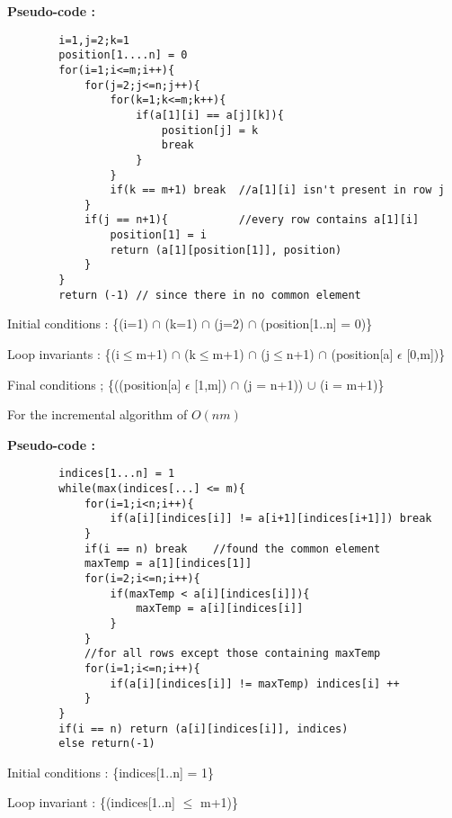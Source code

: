 \documentclass[12pt]{article}
\begin{document}
\begin{enumerate}
    \textbf{Pseudo-code :}
    \begin{verbatim}
        i=1,j=2;k=1
        position[1....n] = 0
        for(i=1;i<=m;i++){
            for(j=2;j<=n;j++){
                for(k=1;k<=m;k++){
                    if(a[1][i] == a[j][k]){
                        position[j] = k
                        break
                    }
                }
                if(k == m+1) break  //a[1][i] isn't present in row j
            }
            if(j == n+1){           //every row contains a[1][i]
                position[1] = i
                return (a[1][position[1]], position)
            }
        }
        return (-1) // since there in no common element
    \end{verbatim}
     Initial conditions : \{(i=1) $\cap$ (k=1) $\cap$ (j=2) $\cap$ (position[1..n] = 0)\}
    
    Loop invariants : \{(i$\leq$m+1) $\cap$ (k$\leq$m+1) $\cap$ (j$\leq$n+1) $\cap$ (position[a] $\epsilon$ [0,m])\}
    
    Final conditions ; \{((position[a] $\epsilon$ [1,m]) $\cap$ (j = n+1)) $\cup$ (i = m+1)\}    
    
    For the incremental algorithm of $O(nm)$
    
    \textbf{Pseudo-code :}
    \begin{verbatim}
        indices[1...n] = 1
        while(max(indices[...] <= m){
            for(i=1;i<n;i++){
                if(a[i][indices[i]] != a[i+1][indices[i+1]]) break
            }
            if(i == n) break    //found the common element
            maxTemp = a[1][indices[1]]
            for(i=2;i<=n;i++){
                if(maxTemp < a[i][indices[i]]){
                    maxTemp = a[i][indices[i]]
                }
            }
            //for all rows except those containing maxTemp
            for(i=1;i<=n;i++){
                if(a[i][indices[i]] != maxTemp) indices[i] ++
            }
        }
        if(i == n) return (a[i][indices[i]], indices)
        else return(-1)
    \end{verbatim}
    Initial conditions : \{indices[1..n] = 1\}
    
    Loop invariant : \{(indices[1..n] $\leq$ m+1)\}
    

\end{enumerate}
\end{document}
